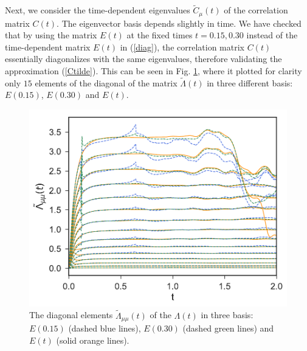\documentclass[b5paper,openright,10pt]{book}
\begin{document}
Next, we consider the time-dependent eigenvalues $\tilde{C}_\mu(t)$ of
the correlation matrix $C(t)$.  The eigenvector basis depends slightly
in time. We have checked that by  using the matrix $E(t)$ at the fixed
times  $t=0.15,0.30$  instead  of  the  time-dependent  matrix  $E(t)$  in
(\ref{diag}), the  correlation matrix $C(t)$  essentially diagonalizes
with  the same  eigenvalues,  therefore  validating the  approximation
(\ref{Ctilde}). 
This can be seen in Fig. \ref{fig:LambdatBasis-WALLS-66nodes}, 
where it plotted for clarity only $15$ elements of the diagonal of the matrix $\tilde{\Lambda}(t)$ in three different basis: 
$E(0.15)$, $E(0.30)$ and $E(t)$. 

\begin{figure}[h!]
  \centering
\includegraphics[scale=0.41]{LambdatBasis-WALLS-66nodes}
\caption[Diagonal elements  $\tilde{\Lambda}_{\mu\mu}(t)$ of $\Lambda(t)$ in three different basis for a confined fluid - Thin bins]{The  diagonal elements  $\tilde{\Lambda}_{\mu\mu}(t)$ of  the
  $\Lambda(t)$ in three basis:
$E(0.15)$ (dashed blue lines), $E(0.30)$ (dashed green lines) and $E(t)$ (solid orange lines). }
\label{fig:LambdatBasis-WALLS-66nodes}
\end{figure}
\end{document}
